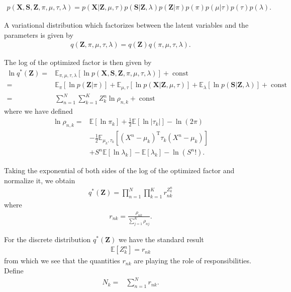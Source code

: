 \documentclass[11pt]{extarticle}
\newcommand{\E}{\mathbb{E}}
\renewcommand{\S}{\mathbf{S}}
\newcommand{\X}{\mathbf{X}}
\newcommand{\Z}{\mathbf{Z}}
\newcommand{\0}{\mathbf{0}}
\renewcommand{\(}{\left(}
\renewcommand{\)}{\right)}
\DeclareMathOperator{\const}{const}
\theoremstyle{definition}
\begin{document}
\begin{align*}
	p(\X, \S, \Z, \pi, \mu, \tau, \lambda) = p(\X|\Z,\mu,\tau) p(\S|\Z,\lambda) p(\Z|\pi) p(\pi) p(\mu|\tau) p(\tau) p(\lambda).
\end{align*}
\par A variational distribution which factorizes between the latent variables and the parameters is given by
\begin{align*}
	q(\Z, \pi, \mu, \tau, \lambda) = q(\Z) q(\pi, \mu, \tau, \lambda).
\end{align*}
\par The log of the optimized factor is then given by
\begin{align*}
	\ln q^{*}(\Z) =& \mathbb{E}_{\pi, \mu, \tau, \lambda}[\ln p(\X, \S, \Z, \pi, \mu, \tau, \lambda)] + \const \\
	=& \mathbb{E}_{\pi}[\ln p(\Z \vert \pi)] + \mathbb{E}_{\mu, \tau}[\ln p(\X \vert \Z, \mu, \tau)] + \mathbb{E}_{\lambda}[\ln p(\S \vert \Z, \lambda)] + \const \\
	=& \sum_{n=1}^{N}\sum_{k=1}^{K} Z^{n}_{k} \ln \rho_{n,k} + \const
\end{align*}
where we have defined
\begin{align*}
	\ln \rho_{n,k} =& \mathbb{E}\left[\ln \pi_{k}\right] + \frac{1}{2}\E\left[\ln\vert\tau_{k}\vert\right] - \ln(2\pi) \\ & - \frac{1}{2} \E_{\mu_{k}, \tau_{k}}\left[ (X^{n} - \mu_{k})^{\mathrm{T}}\tau_{k}(X^{n} - \mu_{k}) \right] \\ & + S^{n} \mathbb{E}[\ln \lambda_{k}] - \mathbb{E}[\lambda_{k}] - \ln\left(S^{n}!\right).
\end{align*}
\par Taking the exponential of both sides of the log of the optimized factor and normalize it, we obtain
\begin{align*}
	q^{*}(\Z) = \prod_{n=1}^{N}\prod_{k=1}^{K} r_{nk}^{Z^{n}_{k}}
\end{align*}
where
\begin{align*}
	r_{nk} = \frac{\rho_{nk}}{\sum_{j=1}^{K}\rho_{nj}}.
\end{align*}
\par For the discrete distribution $q^{*}(\Z)$ we have the standard result
\begin{align*}
	\mathbb{E}[Z^{n}_{k}] = r_{nk}
\end{align*}
from which we see that the quantities $r_{nk}$ are playing the role of responsibilities. Define 
\begin{align*}
	N_{k} =& \sum_{n=1}^{N} r_{nk}.
\end{align*}
\end{document}

